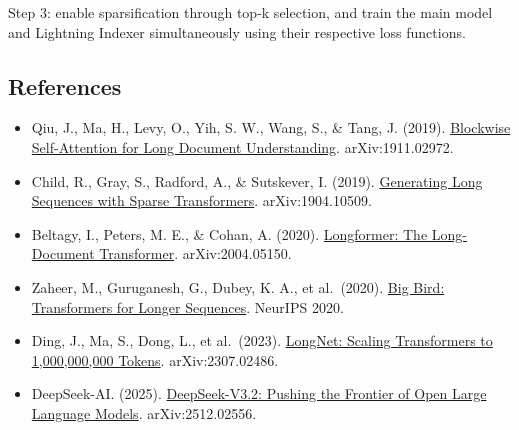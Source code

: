 Step 3: enable sparsification through top-k selection, and train the main model and Lightning Indexer simultaneously using their respective loss functions.

\FloatBarrier
{}
\hypertarget{references-97}{%
\subsection{References}\label{references-97}}

\vspace{0.25em}
\begin{itemize}
\tightlist
\item
  Qiu, J., Ma, H., Levy, O., Yih, S. W., Wang, S., \& Tang, J. (2019). \href{https://arxiv.org/abs/1911.02972}{Blockwise Self-Attention for Long Document Understanding}. arXiv:1911.02972.
\item
  Child, R., Gray, S., Radford, A., \& Sutskever, I. (2019). \href{https://arxiv.org/abs/1904.10509}{Generating Long Sequences with Sparse Transformers}. arXiv:1904.10509.
\item
  Beltagy, I., Peters, M. E., \& Cohan, A. (2020). \href{https://arxiv.org/abs/2004.05150}{Longformer: The Long-Document Transformer}. arXiv:2004.05150.
\item
  Zaheer, M., Guruganesh, G., Dubey, K. A., et al.~(2020). \href{https://arxiv.org/abs/2007.14062}{Big Bird: Transformers for Longer Sequences}. NeurIPS 2020.
\item
  Ding, J., Ma, S., Dong, L., et al.~(2023). \href{https://arxiv.org/abs/2307.02486}{LongNet: Scaling Transformers to 1,000,000,000 Tokens}. arXiv:2307.02486.
\item
  DeepSeek-AI. (2025). \href{https://arxiv.org/abs/2512.02556}{DeepSeek-V3.2: Pushing the Frontier of Open Large Language Models}. arXiv:2512.02556.
\end{itemize}

\clearpage
